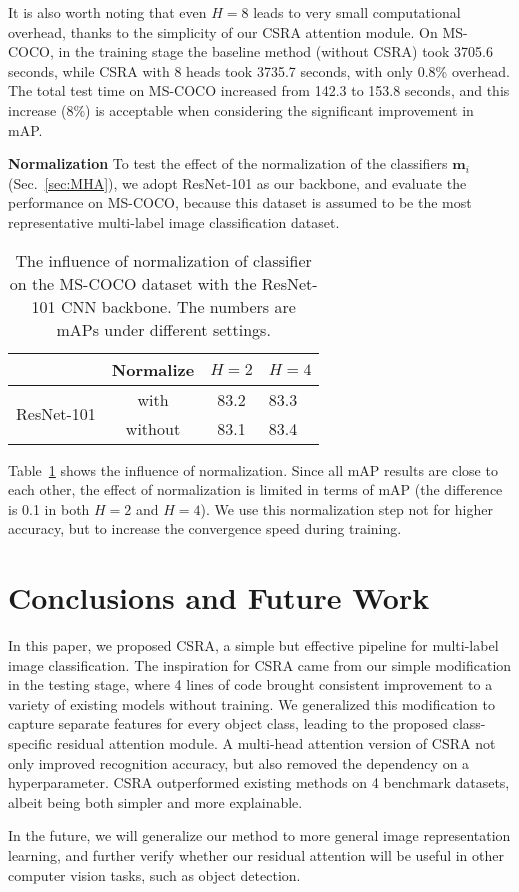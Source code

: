 \documentclass[10pt,twocolumn,letterpaper]{article}
\begin{document}
It is also worth noting that even $H=8$ leads to very small computational overhead, thanks to the simplicity of our CSRA attention module. On MS-COCO, in the training stage the baseline method (without CSRA) took 3705.6 seconds, while CSRA with 8 heads took 3735.7 seconds, with only 0.8\% overhead. The total test time on MS-COCO increased from 142.3 to 153.8 seconds, and this increase (8\%) is acceptable when considering the significant improvement in mAP.

\vspace{6pt}\noindent\textbf{Normalization} To test the effect of the normalization of the classifiers $\mathbf{m}_i$ (Sec.~\ref{sec:MHA}), we adopt ResNet-101 as our backbone, and evaluate the performance on MS-COCO, because this dataset is assumed to be the most representative multi-label image classification dataset.

\begin{table}
	\caption{The influence of normalization of classifier on the MS-COCO dataset with the ResNet-101 CNN backbone. The numbers are mAPs under different settings.}
	\label{tab:normalize}
	\centering
	\small
	\begin{tabular}{c|c|c|l}
		\hline
		                            & Normalize & $H=2$         & $H=4$           \\ \hline\hline
		\multirow{2}{*}{ResNet-101} & with     & 83.2          & 83.3          \\ \cline{2-4}
		                            & without   & 83.1          & 83.4 \\ \hline
	\end{tabular}
\end{table}

Table~\ref{tab:normalize} shows the influence of normalization. Since all mAP results are close to each other, the effect of normalization is limited in terms of mAP (the difference is 0.1 in both $H=2$ and $H=4$). We use this normalization step not for higher accuracy, but to increase the convergence speed during training.

\section{Conclusions and Future Work}

In this paper, we proposed CSRA, a simple but effective pipeline for multi-label image classification. The inspiration for CSRA came from our simple modification in the testing stage, where 4 lines of code brought consistent improvement to a variety of existing models without training. We generalized this modification to capture separate features for every object class, leading to the proposed class-specific residual attention module. A multi-head attention version of CSRA not only improved recognition accuracy, but also removed the dependency on a hyperparameter. CSRA outperformed existing methods on 4 benchmark datasets, albeit being both simpler and more explainable.

In the future, we will generalize our method to more general image representation learning, and further verify whether our residual attention will be useful in other computer vision tasks, such as object detection.


{\small


}
\end{document}
